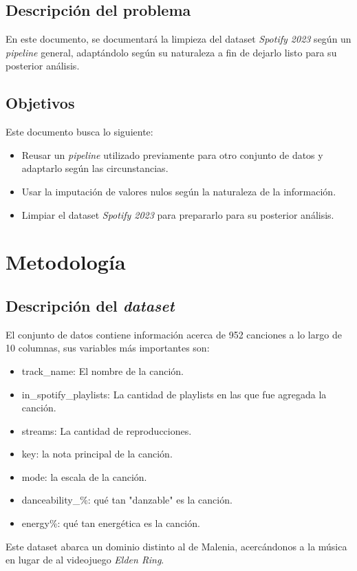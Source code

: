 \documentclass{article}
\begin{document}
	\subsection{Descripción del problema}
	En este documento, se documentará la limpieza del dataset \textit{Spotify 2023} según un \textit{pipeline} general, adaptándolo según su naturaleza a fin de dejarlo listo para su posterior análisis.
	
	\subsection{Objetivos}
	Este documento busca lo siguiente:
	\begin{itemize}
		\item Reusar un \textit{pipeline} utilizado previamente para otro conjunto de datos y adaptarlo según las circunstancias.
		\item Usar la imputación de valores nulos según la naturaleza de la información.
		\item Limpiar el dataset \textit{Spotify 2023} para prepararlo para su posterior análisis.
	\end{itemize}
	
	\section{Metodología}
	\subsection{Descripción del \textit{dataset}}
	El conjunto de datos contiene información acerca de 952 canciones a lo largo de 10 columnas, sus variables más importantes son:
	\begin{itemize}
		\item track\_name: El nombre de la canción.
		\item in\_spotify\_playlists: La cantidad de playlists en las que fue agregada la canción.
		\item streams: La cantidad de reproducciones.
		\item key: la nota principal de la canción.
		\item mode: la escala de la canción.
		\item danceability\_\%: qué tan "danzable" es la canción.
		\item energy\%: qué tan energética es la canción.
	\end{itemize}
	Este dataset abarca un dominio distinto al de Malenia, acercándonos a la música en lugar de al videojuego \textit{Elden Ring}.
	
\end{document}
